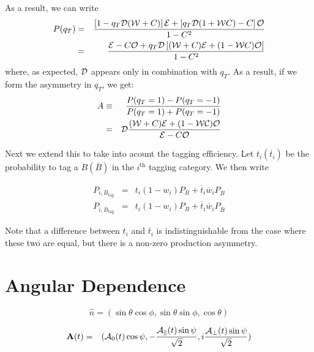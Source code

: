 \documentclass[a4paper,9pt,twoside]{article}
\begin{document}
As a result, we can write
\begin{eqnarray}
   P(q_T) &=& \frac{  \left[ 1-q_T{\cal D}({\cal W}+C) \right]{\cal E}
                               +\left[ q_T{\cal D}(1+{\cal W}C) -  C \right]  {\cal O}
                     }{1-C^2} 
\\ &=& \frac{ {\cal E}-C{\cal O} +q_T{\cal D}\left[ ({\cal W}+C){\cal E} + (1-{\cal W}C){\cal O}\right] }{1-C^2}
\end{eqnarray}
where, as expected, ${\cal D}$ appears only in combination with $q_T$.
As a result, if we form the asymmetry in $q_T$, we get:
\begin{eqnarray}
   A &\equiv& \frac{P(q_T=1)-P(q_T=-1)}{ P(q_T=1)+P(q_T=-1)}
 \\  & = & {\cal D} \frac{ ({\cal W}+C){\cal E} + ( 1-{\cal WC}) {\cal O} } { {\cal E}-C{\cal O} }
\end{eqnarray}

Next we extend this to take into acount the tagging efficiency. Let
$t_i (\overline{t}_i)$ be the probability to tag a $B (\overline{B})$
in the $i^{\mathrm{th}}$ tagging category. We then write

\begin{eqnarray}
   P_{i,B_\mathrm{tag}} &=& t_i(1-w_i) P_{B} + \overline{t}_i\overline{w}_i P_{\overline{ B} }\\
   P_{i,\overline{B}_\mathrm{tag}} &=& t_i(1-w_i) P_{B} +\overline{t}_i \overline{w}_i P_{\overline{ B} }
\end{eqnarray} 

Note that a difference between $t_i$ and $\overline{t}_i$ is indistinguishable from 
the case where these two are equal, but there is a non-zero production asymmetry.


\vfill
\pagebreak

\section{Angular Dependence}


\begin{equation}
  \hat{n} = ( \sin\theta\cos\phi, \sin\theta\sin\phi, \cos\theta )
\end{equation}



\begin{eqnarray}
   {\bf A}(t)            &=&  ( {\cal A}_0(t) \cos\psi          , -\frac{{\cal A}_\parallel(t) \sin\psi}{\sqrt{2}}         ,i\frac{{\cal A}_\perp(t) \sin\psi}{\sqrt{2}}          )  %
\end{eqnarray}
\end{document}
